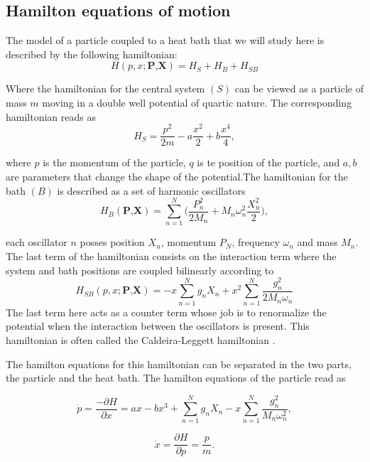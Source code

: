 \subsection{Hamilton equations of motion}
The model of a particle coupled to a heat bath that we will study here is described by the following hamiltonian:
\begin{equation}
H(p,x;\textbf{P,X})=H_{S}+H_B+H_{SB}
\end{equation}

Where the hamiltonian for the central system $(S)$ can be viewed as a particle of mass $m$ moving in a double well potential of quartic nature. The corresponding hamiltonian reads as
\begin{equation}
H_{S}=\frac{p^2}{2m}-a\frac{x^2}{2}+b\frac{x^4}{4},
\end{equation}

where $p$ is the momentum of the particle, $q$ is te position of the particle, and $a,b$ are parameters that change the shape of the potential.The hamiltonian for the bath $(B)$ is described as a set of harmonic oscillators
\begin{equation}
H_B(\textbf{P,X})= \sum_{n=1}^N \Big(\frac{P_n^2}{2M_n}+M_n \omega_n^2\frac{X_n^2}{2} \Big),
\end{equation}

each oscillator $n$ posses position $X_n$, momentum $P_N$, frequency $\omega_n$ and mass $M_n$. The last term of the hamiltonian consists on the interaction term where the system and bath positions are coupled bilinearly according to
\begin{equation}
H_{SB}(p,x;\textbf{P,X})=-x\sum_{n=1}^N g_n X_n+x^2 \sum_{n=1}^N\frac{g_n^2}{2M_n \omega_n}
\end{equation}
The last term here acts as a counter term whose job is to renormalize the potential when the interaction between the oscillators is present. This hamiltonian is often called the Caldeira-Leggett hamiltonian \cite{caldeira1981influence}.\par 

The hamilton equations for this hamiltonian can be separated in the two parts, the particle and the heat bath. The hamilton equations of the particle read as

\begin{equation}
\dot{p}=\frac{-\partial H}{\partial x}=ax-bx^3+\sum_{n=1}^N g_n X_n-x\sum_{n=1}^N \frac{g_n^2}{M_n \omega_n^2},
\end{equation}

\begin{equation}
\dot{x}=\frac{\partial H}{\partial p}=\frac{p}{m}.
\end{equation}

